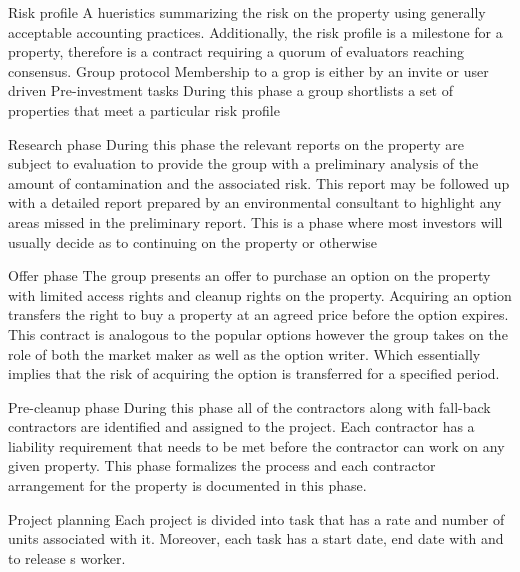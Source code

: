 \documentclass[12pt]{report}
\begin{document}
 Risk profile  A hueristics summarizing the risk on the property using generally acceptable accounting practices. Additionally, 
the risk profile is a milestone for a property, therefore is a contract requiring a quorum of evaluators reaching consensus.  Group protocol  Membership to a grop is either by an invite or user driven  Pre-investment tasks  During this phase a group shortlists a set of properties that meet a particular risk profile 

 Research phase  During this phase the relevant reports on the property are subject to evaluation to provide the group with a preliminary analysis
 of the amount of contamination and the associated risk. This report may be followed up with a detailed report prepared by an 
environmental consultant to highlight any areas missed in the preliminary report. This is a phase where most investors will usually decide 
as to continuing on the property or otherwise

 Offer phase  The group presents an offer to purchase an option on the property with limited access rights and cleanup rights on the property. Acquiring an option transfers the right to 
buy a property at an agreed price before the option expires. This contract is analogous to the 
popular options however the group takes on the role of both the market maker as well as the 
option writer. Which essentially implies that the risk of acquiring the option is transferred for a specified period. 

 Pre-cleanup phase  During this phase all of the contractors along with fall-back contractors are identified 
and assigned to the project. Each contractor has a liability requirement that needs to be met before the contractor can work on any given property. This phase formalizes the process and each contractor arrangement for the property is documented in this phase. 


 Project planning  Each project is divided into task that has a rate and number of units associated with it. Moreover, each task has a start date, end date with  and  to release s worker.
\end{document}
